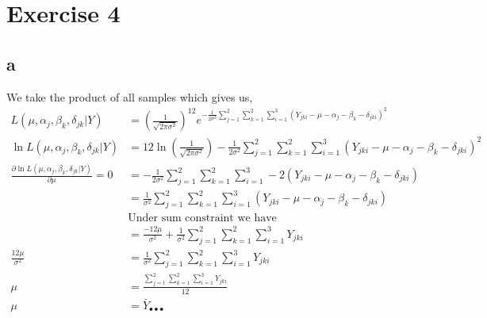 \documentclass{article}
\begin{document}
\section{Exercise 4}
\subsection{a}
We take the product of all samples which gives us,
\begin{align*}
    L(\mu, \alpha_j, \beta_k, \delta_{jk} | Y)
    &=
    \left(\frac{1}{\sqrt{2\pi\sigma^2}}\right)^{12}
    e^{-\frac{1}{2\sigma^2}\sum_{j=1}^2\sum_{k=1}^2\sum_{i=1}^3
    (Y_{jki} - \mu - \alpha_j - \beta_k - \delta_{jki})^2} \\
    \ln L(\mu, \alpha_j, \beta_k, \delta_{jk} | Y)
    &=
    12 \ln\left(\frac{1}{\sqrt{2\pi\sigma^2}}\right)
    -\frac{1}{2\sigma^2}\sum_{j=1}^2\sum_{k=1}^2\sum_{i=1}^3
    (Y_{jki} - \mu - \alpha_j - \beta_k - \delta_{jki})^2 \\
    \frac{\partial\ln L(\mu, \alpha_j, \beta_k, \delta_{jk} | Y)}{\partial\mu}
    = 0 &=
    -\frac{1}{2\sigma^2}\sum_{j=1}^2\sum_{k=1}^2\sum_{i=1}^3
    -2(Y_{jki} - \mu - \alpha_j - \beta_k - \delta_{jki}) \\
    &=
    \frac{1}{\sigma^2}\sum_{j=1}^2\sum_{k=1}^2\sum_{i=1}^3
    (Y_{jki} - \mu - \alpha_j - \beta_k - \delta_{jki}) \\
    &\text{Under sum constraint we have} \\
    &=
    \frac{-12\mu}{\sigma^2} + \frac{1}{\sigma^2}\sum_{j=1}^2\sum_{k=1}^2\sum_{i=1}^3
    Y_{jki} \\
    \frac{12\mu}{\sigma^2} &=
    \frac{1}{\sigma^2}\sum_{j=1}^2\sum_{k=1}^2\sum_{i=1}^3
    Y_{jki} \\
    \mu &=
    \frac{\sum_{j=1}^2\sum_{k=1}^2\sum_{i=1}^3 Y_{jki}}{12} \\
    \mu &= \bar{Y}_{\bullet\bullet\bullet} \\
\end{align*}
\end{document}

